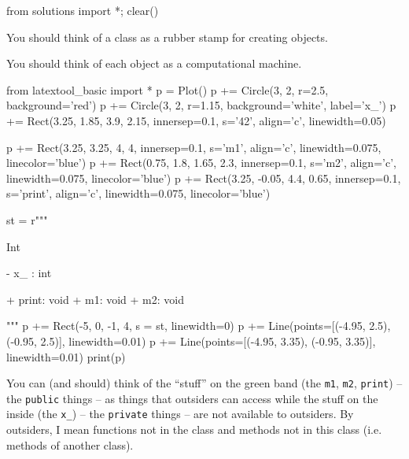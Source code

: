 \begin{python0}
from solutions import *; clear()
\end{python0}

You should think of a class as a rubber stamp for creating objects.

You should think of each object as a computational machine.

\begin{python}
from latextool_basic import *
p = Plot()
p += Circle(3, 2, r=2.5, background='red')
p += Circle(3, 2, r=1.15, background='white', label='x\_')
p += Rect(3.25, 1.85, 3.9, 2.15, innersep=0.1, s='42', align='c', linewidth=0.05)

p += Rect(3.25, 3.25, 4, 4, innersep=0.1, s='m1', align='c', linewidth=0.075, linecolor='blue')
p += Rect(0.75, 1.8, 1.65, 2.3, innersep=0.1, s='m2', align='c', linewidth=0.075, linecolor='blue')
p += Rect(3.25, -0.05, 4.4, 0.65, innersep=0.1, s='print', align='c', linewidth=0.075, linecolor='blue')

st = r"""
\begin{consolethree}
Int

- x_  :  int

+ print: void
+ m1: void
+ m2: void
\end{consolethree}
"""
p += Rect(-5, 0, -1, 4, s = st, linewidth=0)
p += Line(points=[(-4.95, 2.5), (-0.95, 2.5)], linewidth=0.01)
p += Line(points=[(-4.95, 3.35), (-0.95, 3.35)], linewidth=0.01)
print(p)
\end{python}
You can (and should) think of the ``stuff'' on the green band (the
\texttt{m1}, \texttt{m2}, \texttt{print}) -- the \texttt{public} things -- as
things that outsiders can access while the stuff on the inside (the
\texttt{x\_}) -- the \texttt{private} things -- are not available to
outsiders. By outsiders, I mean functions not in the class and methods
not in this class (i.e. methods of another class).


